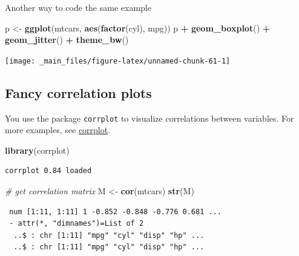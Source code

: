 \documentclass[
]{book}
\newenvironment{Shaded}{\begin{snugshade}}{\end{snugshade}}
\newcommand{\CommentTok}[1]{\textcolor[rgb]{0.56,0.35,0.01}{\textit{#1}}}
\newcommand{\KeywordTok}[1]{\textcolor[rgb]{0.13,0.29,0.53}{\textbf{#1}}}
\newcommand{\NormalTok}[1]{#1}
\newcommand{\OperatorTok}[1]{\textcolor[rgb]{0.81,0.36,0.00}{\textbf{#1}}}
\newcommand{\StringTok}[1]{\textcolor[rgb]{0.31,0.60,0.02}{#1}}
\begin{document}
Another way to code the same example

\begin{Shaded}
\begin{Highlighting}[]
\NormalTok{p <-}\StringTok{ }\KeywordTok{ggplot}\NormalTok{(mtcars, }\KeywordTok{aes}\NormalTok{(}\KeywordTok{factor}\NormalTok{(cyl), mpg))}
\NormalTok{p }\OperatorTok{+}\StringTok{ }\KeywordTok{geom_boxplot}\NormalTok{() }\OperatorTok{+}\StringTok{ }\KeywordTok{geom_jitter}\NormalTok{() }\OperatorTok{+}\StringTok{ }\KeywordTok{theme_bw}\NormalTok{()}
\end{Highlighting}
\end{Shaded}

\begin{center}\texttt{[image: \_main\_files/figure-latex/unnamed-chunk-61-1]} \end{center}

\hypertarget{fancy-correlation-plots}{%
\subsection{Fancy correlation plots}\label{fancy-correlation-plots}}

You use the package \texttt{corrplot} to visualize correlations between variables. For more examples, see \href{http://cran.r-project.org/web/packages/corrplot/vignettes/corrplot-intro.html}{corrplot}.

\begin{Shaded}
\begin{Highlighting}[]
\KeywordTok{library}\NormalTok{(corrplot)}
\end{Highlighting}
\end{Shaded}

\begin{verbatim}
corrplot 0.84 loaded
\end{verbatim}

\begin{Shaded}
\begin{Highlighting}[]
\CommentTok{# get correlation matrix}
\NormalTok{M <-}\StringTok{ }\KeywordTok{cor}\NormalTok{(mtcars)}
\KeywordTok{str}\NormalTok{(M)}
\end{Highlighting}
\end{Shaded}

\begin{verbatim}
 num [1:11, 1:11] 1 -0.852 -0.848 -0.776 0.681 ...
 - attr(*, "dimnames")=List of 2
  ..$ : chr [1:11] "mpg" "cyl" "disp" "hp" ...
  ..$ : chr [1:11] "mpg" "cyl" "disp" "hp" ...
\end{verbatim}
\end{document}
